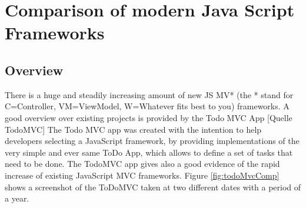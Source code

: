 \chapter{Comparison of modern Java Script Frameworks}


 
\section{Overview}

\autocite{Doe:2009:Online} There is a huge and steadily increasing amount of new JS MV* (the * stand for C=Controller, VM=ViewModel, W=Whatever fits best to you) frameworks. 
A good overview over existing projects is provided by the Todo MVC App [Quelle TodoMVC]
The Todo MVC app was created with the intention to help developers selecting a JavaScript framework, by providing implementations of the very simple and ever same 
ToDo App, which allows to define a set of tasks that need to be done. 
The TodoMVC app gives also a good evidence of the rapid increase of existing JavaScript MVC frameworks. Figure \ref{fig:todoMvcComp} shows a screenshot of the ToDoMVC taken at two different dates with a period of a year.

